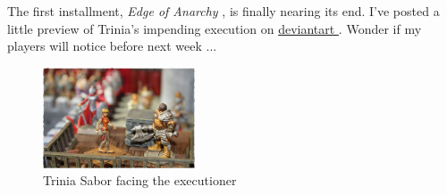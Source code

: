 The first installment, {\itshape Edge of Anarchy} , is finally nearing its end. I've posted a little preview of Trinia's impending execution on \hyperref[fig:Trinia-Sabor-facing-the-executioner-470603042]{ deviantart } . Wonder if my players will notice before next week ... \\

\begin{figure}[h]
	\centering
	\includegraphics[width=0.4\textwidth]{images/Trinia-Sabor-facing-the-executioner-470603042_mod.jpg}
	\caption{Trinia Sabor facing the executioner}
	\label{fig:Trinia-Sabor-facing-the-executioner-470603042}
\end{figure}


